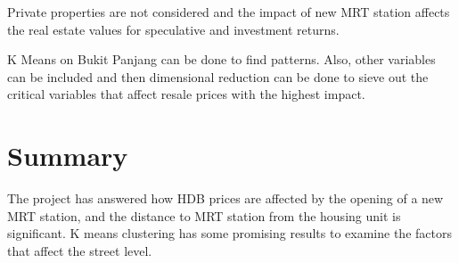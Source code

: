 \documentclass[]{book}
\begin{document}
Private properties are not considered and the impact of new MRT station
affects the real estate values for speculative and investment returns.

K Means on Bukit Panjang can be done to find patterns. Also, other
variables can be included and then dimensional reduction can be done to
sieve out the critical variables that affect resale prices with the
highest impact.

\chapter{Summary}\label{summary}

The project has answered how HDB prices are affected by the opening of a
new MRT station, and the distance to MRT station from the housing unit
is significant. K means clustering has some promising results to examine
the factors that affect the street level.


\end{document}
